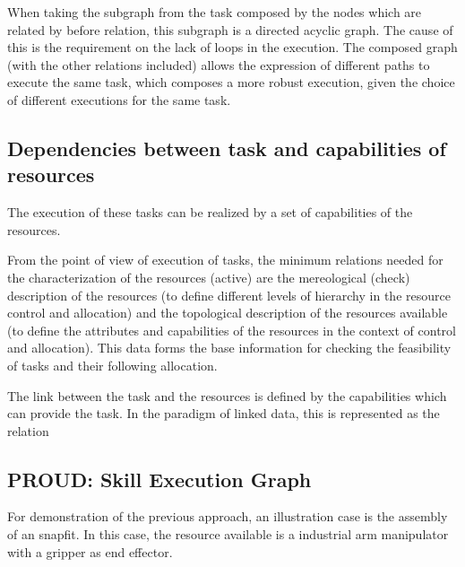 \documentclass[a4paper,10pt]{article}
\begin{document}
When taking the subgraph from the task composed by the nodes which are related by before relation, this subgraph is a directed acyclic graph. The cause of this is the requirement on the lack of loops in the execution. 
The composed graph (with the other relations included) allows the expression of different paths to execute the same task, which composes a more robust execution, given the choice of different executions for the same task. %

\subsection{Dependencies between task and capabilities of resources} 

The execution of these tasks can be realized by a set of capabilities of the resources. 


From the point of view of execution of tasks, the minimum relations needed for the characterization of the resources (active) %
are the mereological (check) description of the resources (to define different levels of hierarchy in the resource control and allocation) and the topological description of the resources available (to define the attributes and capabilities of the resources in the context of control and allocation). This data forms the base information for checking the feasibility of tasks and their following allocation.



The link between the task and the resources is defined by the capabilities which can provide the task. In the paradigm of linked data, this is represented as the relation %


\subsection{PROUD: Skill Execution Graph}

For demonstration of the previous approach, an illustration case is the assembly of an snapfit. In this case, the resource available is a industrial arm manipulator with a gripper as end effector.
\end{document}
